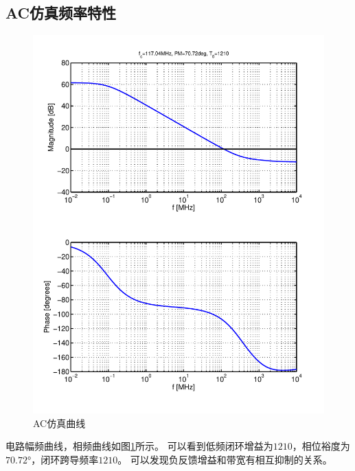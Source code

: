 \documentclass[a4paper]{article}
\newcommand{\udeg}{\si{\degree}}
\begin{document}
\subsection{AC仿真频率特性}
\begin{figure}[htb]
    \begin{center}
        \includegraphics[width=\textwidth]{fast/ac.pdf}
    \end{center}
    \caption{AC仿真曲线}
    \label{fastac}
\end{figure}
电路幅频曲线，相频曲线如图\ref{fastac}所示。
可以看到低频闭环增益为$1210$，相位裕度为$70.72\udeg$，闭环跨导频率$1210$。
可以发现负反馈增益和带宽有相互抑制的关系。
\newpage
\end{document}
